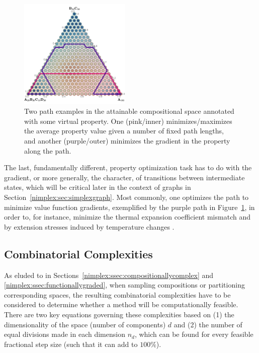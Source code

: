 \begin{figure}[H]
    \centering
    \includegraphics[width=0.475\textwidth]{nimplex/PathPlanning_2.png}
    \caption{Two path examples in the attainable compositional space annotated with some virtual property. One (pink/inner) minimizes/maximizes the average property value given a number of fixed path lengths, and another (purple/outer) minimizes the gradient in the property along the path.} 
    \label{nimplex:fig:pathplanning2}
\end{figure}

The last, fundamentally different, property optimization task has to do with the gradient, or more generally, the character, of transitions between intermediate states, which will be critical later in the context of graphs in Section~\ref{nimplex:sec:simplexgraph}. Most commonly, one optimizes the path to minimize value function gradients, exemplified by the purple path in Figure~\ref{nimplex:fig:pathplanning2}, in order to, for instance, minimize the thermal expansion coefficient mismatch and by extension stresses induced by temperature changes \cite{Kirk2021ComputationalMonotonicity}.



\subsection{Combinatorial Complexities} \label{nimplex:ssec:combinatorialcomplexities}

As eluded to in Sections~\ref{nimplex:ssec:compositionallycomplex} and \ref{nimplex:ssec:functionallygraded}, when sampling compositions or partitioning corresponding spaces, the resulting combinatorial complexities have to be considered to determine whether a method will be computationally feasible. There are two key equations governing these complexities based on (1) the dimensionality of the space (number of components) $d$ and (2) the number of equal divisions made in each dimension $n_d$, which can be found for every feasible fractional step size (such that it can add to $100\%$). 


